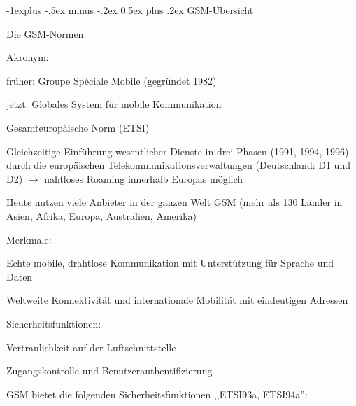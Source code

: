 \documentclass[a4paper]{article}
\makeatletter
\renewcommand{\subsection}{\@startsection{subsection}{2}{0mm}%
 {-1explus -.5ex minus -.2ex}%
 {0.5ex plus .2ex}%
 {\normalfont\normalsize\bfseries}}
\makeatother
\begin{document}
\begin{multicols}{3}
      \subsection{GSM-Übersicht}
      \begin{itemize*}
            \item Die GSM-Normen:
            \begin{itemize*}
                  \item Akronym:
                  \begin{itemize*}
                        \item früher: Groupe Spéciale Mobile (gegründet 1982)
                        \item jetzt: Globales System für mobile Kommunikation
                  \end{itemize*}
                  \item Gesamteuropäische Norm (ETSI)
                  \item Gleichzeitige Einführung wesentlicher Dienste in drei Phasen (1991, 1994, 1996) durch die europäischen Telekommunikationsverwaltungen (Deutschland: D1 und D2) $\rightarrow$ nahtloses Roaming innerhalb Europas möglich
                  \item Heute nutzen viele Anbieter in der ganzen Welt GSM (mehr als 130 Länder in Asien, Afrika, Europa, Australien, Amerika)
            \end{itemize*}
            \item Merkmale:
            \begin{itemize*}
                  \item Echte mobile, drahtlose Kommunikation mit Unterstützung für Sprache und Daten
                  \item Weltweite Konnektivität und internationale Mobilität mit eindeutigen Adressen
                  \item Sicherheitsfunktionen:
                  \begin{itemize*}
                        \item Vertraulichkeit auf der Luftschnittstelle
                        \item Zugangskontrolle und Benutzerauthentifizierung
                  \end{itemize*}
            \end{itemize*}
            \item GSM bietet die folgenden Sicherheitsfunktionen ,,ETSI93a, ETSI94a'':
            \begin{itemize*}

\end{itemize*}
\end{itemize*}
\end{multicols}
\end{document}
